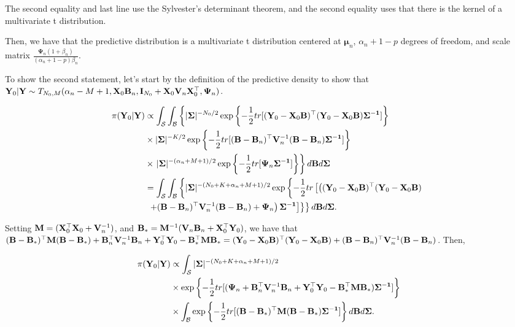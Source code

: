 \begin{enumerate}[leftmargin=*]
The second equality and last line use the Sylvester's determinant theorem, and the second equality uses that there is the kernel of a multivariate t distribution.

Then, we have that the predictive distribution is a multivariate t distribution centered at $\bm{\mu}_n$, $\alpha_n+1-p$ degrees of freedom, and scale matrix $\frac{\mathbf{\Psi}_n(1+\beta_n)}{(\alpha_n+1-p)\beta_n}$.

To show the second statement, let's start by the definition of the predictive density to show that ${\bf{Y}}_0|{\bf{Y}}\sim T_{N_0,M}(\alpha_n-M+1,{\bf{X}}_0{\bf{B}}_n,{\bf{I}}_{N_0}+{\bf{X}}_0{\bf{V}}_n{\bf{X}}_0^{\top},{\bf{\Psi}}_n)$.

\begin{align*}
	\pi({\bf{Y}}_0|{\bf{Y}})&\propto\int_{\mathcal{S}}\int_{\mathcal{B}}\left\{ |{\bf{\Sigma}}|^{-N_0/2}\exp\left\{-\frac{1}{2}tr[({\bf{Y}}_0-{\bf{X}}_0{\bf{B}})^{\top}({\bf{Y}}_0-{\bf{X}}_0{\bf{B}}){\bf{\Sigma}^{-1}}]\right\}\right.\\
	&\times |{\bf{\Sigma}}|^{-K/2}\exp\left\{-\frac{1}{2}tr[({\bf{B}}-{\bf{B}}_n)^{\top}{\bf{V}}_n^{-1}({\bf{B}}-{\bf{B}}_n){\bf{\Sigma}^{-1}}]\right\}\\
	&\times\left. |{\bf{\Sigma}}|^{-(\alpha_n+M+1)/2}\exp\left\{-\frac{1}{2}tr[{\bf{\Psi}}_n{\bf{\Sigma}^{-1}}]\right\}\right\}d{\bf{B}}d{\bf{\Sigma}}\\
	&=\int_{\mathcal{S}}\int_{\mathcal{B}}\left\{ |{\bf{\Sigma}}|^{-(N_0+K+\alpha_n+M+1)/2}\exp\left\{-\frac{1}{2}tr\left[\left(({\bf{Y}}_0-{\bf{X}}_0{\bf{B}})^{\top}({\bf{Y}}_0-{\bf{X}}_0{\bf{B}})\right.\right.\right.\right.\\
	&\left.\left.\left.\left.+({\bf{B}}-{\bf{B}}_n)^{\top}{\bf{V}}_n^{-1}({\bf{B}}-{\bf{B}}_n)+{\bf{\Psi}}_n\right){\bf{\Sigma}^{-1}}\right]\right\}\right\}d{\bf{B}}d{\bf{\Sigma}}.	 
\end{align*}

Setting ${\bf{M}}=({\bf{X}}_0^{\top}{\bf{X}}_0+{\bf{V}}_n^{-1})$, and ${\bf{B}}_{*}={\bf{M}}^{-1}({\bf{V}}_n{\bf{B}}_n+{\bf{X}}_0^{\top}{\bf{Y}}_0)$, we have that $({\bf{B}}-{\bf{B}}_*)^{\top}{\bf{M}}({\bf{B}}-{\bf{B}}_*)+{\bf{B}}_n^{\top}{\bf{V}}_n^{-1}{\bf{B}}_n+{\bf{Y}}_0^{\top}{\bf{Y}}_0-{\bf{B}}_*^{\top}{\bf{M}}{\bf{B}}_*=({\bf{Y}}_0-{\bf{X}}_0{\bf{B}})^{\top}({\bf{Y}}_0-{\bf{X}}_0{\bf{B}})+({\bf{B}}-{\bf{B}}_n)^{\top}{\bf{V}}_n^{-1}({\bf{B}}-{\bf{B}}_n)$. Then,

\begin{align*}
	\pi({\bf{Y}}_0|{\bf{Y}})&\propto \int_{\mathcal{S}}|{\bf{\Sigma}}|^{-(N_0+K+\alpha_n+M+1)/2}\\
	&\times \exp\left\{-\frac{1}{2}tr[({\bf{\Psi}}_n+{\bf{B}}_n^{\top}{\bf{V}}_n^{-1}{\bf{B}}_n+{\bf{Y}}_0^{\top}{\bf{Y}}_0-{\bf{B}}_*^{\top}{\bf{M}}{\bf{B}}_*){\bf{\Sigma}^{-1}}]\right\}\\
	&\times\int_{\mathcal{B}}\exp\left\{-\frac{1}{2}tr[({\bf{B}}-{\bf{B}}_*)^{\top}{\bf{M}}({\bf{B}}-{\bf{B}}_*){\bf{\Sigma}^{-1}}]\right\}d{\bf{B}}d{\bf{\Sigma}}.
\end{align*} 


\end{enumerate}
